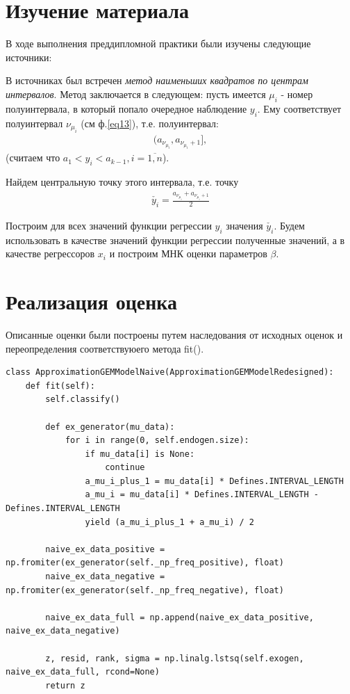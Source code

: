 

\section{Изучение материала}
В ходе выполнения преддипломной практики были изучены следующие источники:


В источниках был встречен \textit{метод наименьших квадратов по центрам интервалов}.
Метод заключается в следующем:
пусть имеется $\mu_i$ - номер полуинтервала, в который попало очередное наблюдение $y_i$. Ему соответствует полуинтервал $\nu_{\mu_i}$ (см ф.\ref{eq13}), т.е. полуинтервал:
\begin{eqnarray}
    (a_{\nu_{\mu_i}},a_{\nu_{\mu_i}+1}],
\end{eqnarray}
(считаем что $a_1<y_i<a_{k-1}, i=\overline{1,n}$).

Найдем центральную точку этого интервала, т.е. точку
\begin{eqnarray}
    \check{y_i} = \frac{a_{\nu_{\mu_i}} + a_{\nu_{\mu_i}+1}}{2}
\end{eqnarray}

Построим для всех значений функции регрессии $y_i$ значения $\check{y_i}$.
Будем использовать в качестве значений функции регрессии полученные значений, а в качестве регрессоров $x_i$ и построим МНК оценки параметров $\beta$.

\newpage
\section{Реализация оценка}
Описанные оценки были построены путем наследования от исходных оценок и переопределения соответствуюего метода fit(). 
\begin{Verbatim}[fontsize=\scriptsize]
class ApproximationGEMModelNaive(ApproximationGEMModelRedesigned):
    def fit(self):
        self.classify()

        def ex_generator(mu_data):
            for i in range(0, self.endogen.size):
                if mu_data[i] is None:
                    continue
                a_mu_i_plus_1 = mu_data[i] * Defines.INTERVAL_LENGTH
                a_mu_i = mu_data[i] * Defines.INTERVAL_LENGTH - Defines.INTERVAL_LENGTH
                yield (a_mu_i_plus_1 + a_mu_i) / 2

        naive_ex_data_positive = np.fromiter(ex_generator(self._np_freq_positive), float)
        naive_ex_data_negative = np.fromiter(ex_generator(self._np_freq_negative), float)

        naive_ex_data_full = np.append(naive_ex_data_positive, naive_ex_data_negative)

        z, resid, rank, sigma = np.linalg.lstsq(self.exogen, naive_ex_data_full, rcond=None)
        return z
\end{Verbatim}


